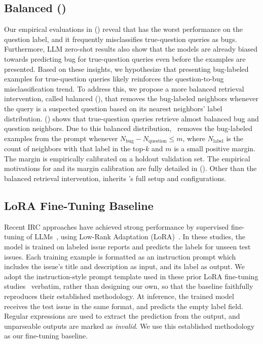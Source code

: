 \subsection{Balanced \ragtag (\bragtag)}
\label{sec:approach-bragtag}
Our empirical evaluations in () reveal that \ragtag has the worst performance on the question label, and it frequently misclassifies true-question queries as bugs. Furthermore, LLM zero-shot results also show that the models are already biased towards predicting bug for true-question queries even before the examples are presented. Based on these insights, we hypothesize that presenting bug-labeled examples for true-question queries likely reinforces the question-to-bug misclassification trend. To address this, we propose a more balanced retrieval intervention, called balanced \ragtag (\bragtag), that removes the bug-labeled neighbors whenever the query is a suspected question based on its nearest neighbors' label distribution. () shows that true-question queries retrieve almost balanced bug and question neighbors. Due to this balanced distribution, \bragtag\ removes the bug-labeled examples from the prompt whenever $N_\text{bug} - N_\text{question} \le m$, where $N_\text{label}$ is the count of neighbors with that label in the top-$k$ and $m$ is a small positive margin. The margin is empirically calibrated on a holdout validation set. The empirical motivations for \bragtag and its margin calibration are fully detailed in (). Other than the balanced retrieval intervention, \bragtag inherits \ragtag's full setup and configurations.



\subsection{LoRA Fine-Tuning Baseline}
\label{sec:finetune}
Recent IRC approaches have achieved strong performance by supervised
fine-tuning of LLMs~\cite{heo2025study,aracena2025applying,
aracena2024applyinglargelanguagemodels}, using Low-Rank Adaptation
(LoRA)~\cite{hu2022lora}. In these studies, the
model is trained on labeled issue reports and predicts the labels for
unseen test issues. Each training example is formatted as an
instruction prompt which includes the issue's title and description
as input, and its label as output. We adopt the instruction-style
prompt template used in these prior LoRA fine-tuning
studies~\cite{heo2025study,aracena2025applying} verbatim, rather than
designing our own, so that the baseline faithfully reproduces their
established methodology. At inference, the trained model
receives the test issue in the same format, and predicts the empty
label field. Regular expressions are used to extract the prediction
from the output, and unparseable outputs are marked as
\textit{invalid}. We use this established methodology as our fine-tuning baseline.

